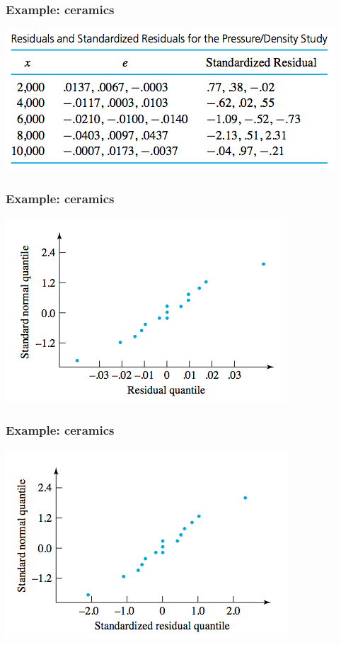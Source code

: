 \documentclass[handout]{beamer}\usepackage[]{graphicx}\usepackage[]{color}
\numberwithin{equation}{section}
\begin{document}
\begin{frame}
\frametitle{Example: ceramics}
\begin{center}
 \includegraphics{../../fig/stdres.png}
\end{center}
\end{frame}

\begin{frame}
\frametitle{Example: ceramics}
\begin{center}
 \includegraphics{../../fig/ceramrawres.png}
\end{center}
\end{frame}

\begin{frame}
\frametitle{Example: ceramics}
\begin{center}
 \includegraphics{../../fig/ceramstdres.png}
\end{center}
\end{frame}
\end{document}
